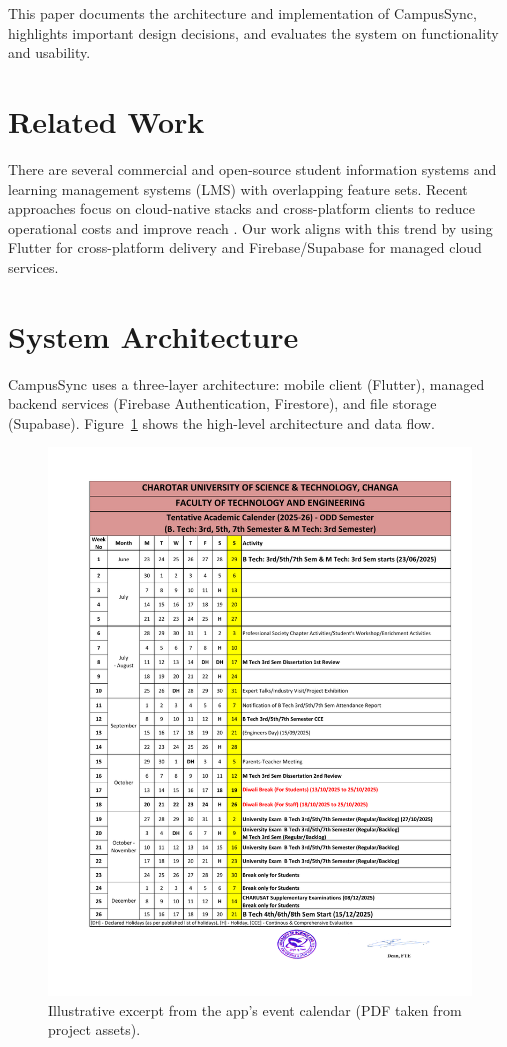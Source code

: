 \documentclass[conference]{IEEEtran}
\begin{document}
This paper documents the architecture and implementation of CampusSync, highlights important design decisions, and evaluates the system on functionality and usability.

\section{Related Work}
There are several commercial and open-source student information systems and learning management systems (LMS) with overlapping feature sets. Recent approaches focus on cloud-native stacks and cross-platform clients to reduce operational costs and improve reach \cite{lms_survey, mobile_unified}. Our work aligns with this trend by using Flutter for cross-platform delivery and Firebase/Supabase for managed cloud services.

\section{System Architecture}
CampusSync uses a three-layer architecture: mobile client (Flutter), managed backend services (Firebase Authentication, Firestore), and file storage (Supabase). Figure~\ref{fig:architecture} shows the high-level architecture and data flow.

\begin{figure}[h]
    \centering
    \includegraphics[width=0.95\columnwidth]{assets/event_calendar.pdf}
    \caption{Illustrative excerpt from the app's event calendar (PDF taken from project assets).}
    \label{fig:architecture}
\end{figure}
\end{document}
